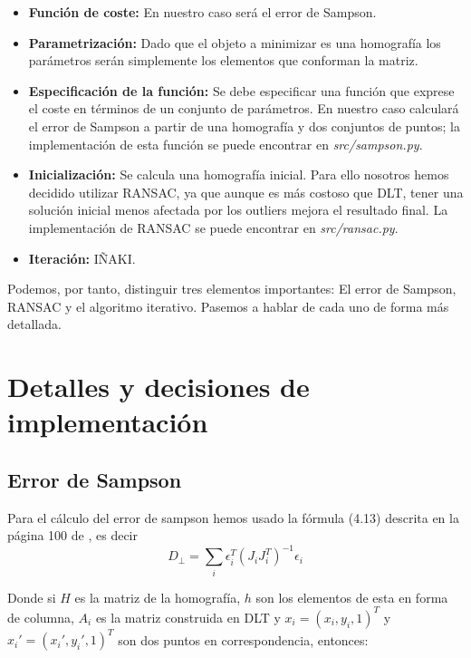 \begin{itemize}
  \item \textbf{Función de coste:} En nuestro caso será el error de Sampson.\\
  
  \item \textbf{Parametrización:} Dado que el objeto a minimizar es una homografía los parámetros serán simplemente los elementos que conforman la matriz.\\
  
  \item \textbf{Especificación de la función:} Se debe especificar una función que exprese el coste en términos de un conjunto de parámetros. En nuestro caso calculará el error de Sampson a partir de una homografía y dos conjuntos de puntos; la implementación de esta función se puede encontrar en \textit{src/sampson.py}.\\
  
  \item \textbf{Inicialización:} Se calcula una homografía inicial. Para ello nosotros hemos decidido utilizar RANSAC, ya que aunque es más costoso que DLT, tener una solución inicial menos afectada por los outliers mejora el resultado final. La implementación de RANSAC se puede encontrar en \textit{src/ransac.py}.\\
  
  \item \textbf{Iteración:} IÑAKI.\\
\end{itemize}

Podemos, por tanto, distinguir tres elementos importantes: El error de Sampson, \mbox{RANSAC} y el algoritmo iterativo. Pasemos a hablar de cada uno de forma más detallada.


\section{Detalles y decisiones de implementación}

\subsection{Error de Sampson}
Para el cálculo del error de sampson hemos usado la fórmula (4.13) descrita en la página 100 de \cite{mvg}, es decir
$$D_{\bot} = \sum_i{\epsilon_i^T (J_i J_i^T)^{-1} \epsilon_i}$$

Donde si $H$ es la matriz de la homografía, $h$ son los elementos de esta en forma de columna, $A_i$ es la matriz construida en DLT y $x_i = (x_i, y_i, 1)^T$ y $x_i' = (x_i', y_i', 1)^T$ son dos puntos en correspondencia, entonces:

